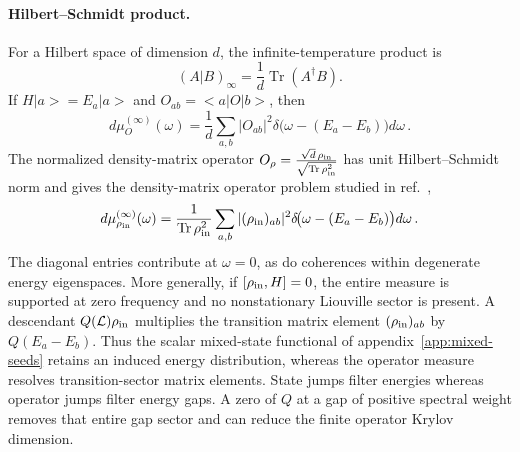 \documentclass[a4paper,11pt]{article}
\def\ket#1{|#1>}%
\def\bra#1{<#1|}%
\def\dd{d}%
\theoremstyle{definition}
\theoremstyle{remark}
\newcommand{\ket}[1]{|#1\rangle}
\newcommand{\bra}[1]{\langle #1|}
\newcommand{\dd}{\mathrm d}
\begin{document}
\paragraph{Hilbert--Schmidt product.}
For a Hilbert space of dimension $d$, the infinite-temperature product is
\begin{equation}
   (A|B)_\infty
   =\frac{1}{d}\operatorname{Tr}(A^\dagger B).
   \label{eq:operator-HS-inner-product-app}
\end{equation}
If $H\ket a=E_a\ket a$ and $O_{ab}=\bra aO\ket b$, then
\begin{equation}
   \dd\mu_O^{(\infty)}(\omega)
   =\frac{1}{d}\sum_{a,b}|O_{ab}|^2
      \delta\!\bigl(\omega-(E_a-E_b)\bigr)\dd\omega\,.
   \label{eq:operator-gap-measure-app}
\end{equation}
The normalized density-matrix operator
$
   O_\rho
   =\frac{\sqrt d\,\rho_{\rm in}}
          {\sqrt{\operatorname{Tr}\rho_{\rm in}^2}}
$ 
has unit Hilbert--Schmidt norm and gives the density-matrix operator
problem studied in ref.~\cite{CaputaDensityMatrix2024},
\begin{equation}
   \dd\mu_{\rho_{\rm in}}^{(\infty)}(\omega)
   =\frac{1}{\operatorname{Tr}\rho_{\rm in}^2}
      \sum_{a,b}|(\rho_{\rm in})_{ab}|^2
      \delta\!\bigl(\omega-(E_a-E_b)\bigr)\dd\omega\,.
   \label{eq:density-operator-gap-measure-app}
\end{equation}
The diagonal entries contribute at $\omega=0$, as do coherences within
degenerate energy eigenspaces.  More generally, if
$[\rho_{\rm in},H]=0$, the entire measure is supported at zero frequency
and no nonstationary Liouville sector is present.  A descendant
$Q(\mathcal L)\rho_{\rm in}$ multiplies the transition matrix element
$(\rho_{\rm in})_{ab}$ by $Q(E_a-E_b)$.  Thus the scalar mixed-state
functional of appendix~\ref{app:mixed-seeds} retains an induced energy
   distribution, whereas the operator measure resolves transition-sector
   matrix elements.  State jumps filter energies whereas operator jumps filter
energy gaps.  A zero of $Q$ at a gap of positive spectral weight removes
that entire gap sector and can reduce the finite operator Krylov
dimension.
\end{document}
